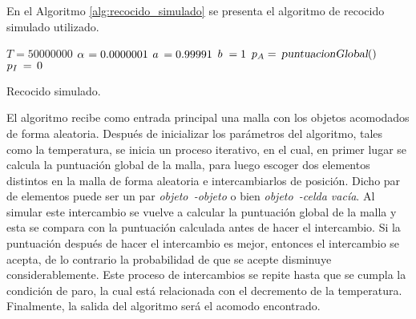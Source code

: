 En el Algoritmo \ref{alg:recocido_simulado} se presenta el algoritmo de recocido simulado utilizado.
%
\begin{center}
\begin{minipage}{0.98\textwidth}
\setlength{\interspacetitleruled}{5pt}
\begin{algorithm}[H]
	\OneQuarterBlankLine
	\HalfBlankLine
	\TwoBlankLines
	$T = \num{50000000}$\;
	$\mathrlap{\alpha}\hphantom{T} = 0.0000001$\;
	$\mathrlap{a}\hphantom{T} = 0.99991$\;
	$\mathrlap{b}\hphantom{T} = 1$\;
	\TwoBlankLines
	$p_A =\, \textsl{puntuacionGlobal}()$\;
	$\mathrlap{p_I}\hphantom{p_A} =\, 0$\;
	\TwoBlankLines
	\HalfBlankLine
	\caption{Recocido simulado.}%
	\label{alg:recocido_simulado}%
\end{algorithm}
\end{minipage}
\end{center}
%
El algoritmo recibe como entrada principal una malla con los objetos acomodados de forma aleatoria. 
Después de inicializar los parámetros del algoritmo, tales como la temperatura, se inicia un proceso iterativo, en el cual, en primer lugar se calcula la puntuación global de la malla, para luego escoger dos elementos distintos en la malla de forma aleatoria e intercambiarlos de posición.
Dicho par de elementos puede ser un par \textsl{objeto~-objeto} o bien \textsl{objeto~-celda\! vacía}.
Al simular este intercambio se vuelve a calcular la puntuación global de la malla y esta se compara con la puntuación calculada antes de hacer el intercambio.
Si la puntuación después de hacer el intercambio es mejor, entonces el intercambio se acepta, de lo contrario la probabilidad de que se acepte disminuye considerablemente.
Este proceso de intercambios se repite hasta que se cumpla la condición de paro, la cual está relacionada con el decremento de la temperatura.
Finalmente, la salida del algoritmo será el acomodo encontrado.

